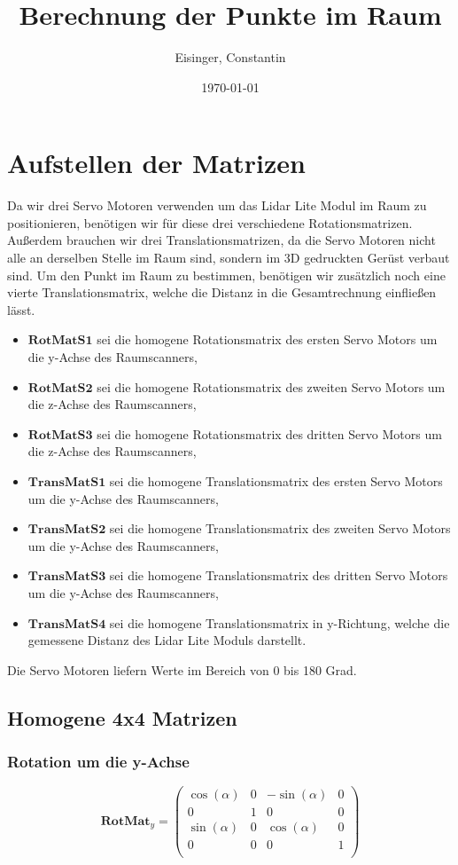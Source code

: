 \documentclass[a4paper,11pt,DIV11]{scrartcl}
\title{Berechnung der Punkte im Raum}
\author{Eisinger, Constantin}
\date{\today}
\begin{document}
\maketitle




\section{Aufstellen der Matrizen}
Da wir drei Servo Motoren verwenden um das Lidar Lite Modul im Raum zu positionieren, benötigen wir für diese drei verschiedene Rotationsmatrizen. Außerdem brauchen wir drei Translationsmatrizen, da die Servo Motoren nicht alle an derselben Stelle im Raum sind, sondern im 3D gedruckten Gerüst verbaut sind. Um den Punkt im Raum zu bestimmen, benötigen wir zusätzlich noch eine vierte Translationsmatrix, welche die Distanz in die Gesamtrechnung einfließen lässt.

\begin{itemize}
\item $\bm{RotMatS1}$ sei die homogene Rotationsmatrix des ersten Servo Motors um die y-Achse des Raumscanners,
\item $\bm{RotMatS2}$ sei die homogene Rotationsmatrix des zweiten Servo Motors um die z-Achse des Raumscanners,
\item $\bm{RotMatS3}$ sei die homogene Rotationsmatrix des dritten Servo Motors um die z-Achse des Raumscanners,
\item $\bm{TransMatS1}$ sei die homogene Translationsmatrix des ersten Servo Motors um die y-Achse des Raumscanners,
\item $\bm{TransMatS2}$ sei die homogene Translationsmatrix des zweiten Servo Motors um die y-Achse des Raumscanners,
\item $\bm{TransMatS3}$ sei die homogene Translationsmatrix des dritten Servo Motors um die y-Achse des Raumscanners,
\item $\bm{TransMatS4}$ sei die homogene Translationsmatrix in y-Richtung, welche die gemessene Distanz des Lidar Lite Moduls darstellt.
\end{itemize}

Die Servo Motoren liefern Werte im Bereich von 0 bis 180 Grad.

\subsection{Homogene 4x4 Matrizen}
\subsubsection*{Rotation um die y-Achse}
\begin{equation}
\bm{RotMat}_{y} = 
\begin{pmatrix}
\cos(\alpha) & 0 &-\sin(\alpha) & 0 \\
0 & 1 & 0 & 0 \\
\sin(\alpha) & 0 & \cos(\alpha) & 0 \\
0 & 0 & 0 & 1 \\
\end{pmatrix}
\end{equation}
\end{document}
